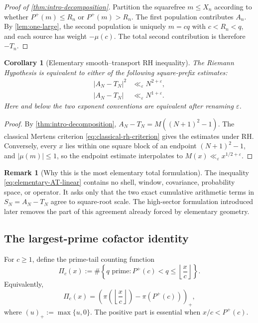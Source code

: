 \documentclass[11pt]{article}
\newtheorem{corollary}[theorem]{Corollary}
\theoremstyle{definition}
\newtheorem{remark}[theorem]{Remark}
\newcommand{\eps}{\varepsilon}
\newcommand{\Pplus}{P^{+}}
\newcommand{\1}{\mathbf{1}}
\begin{document}
\begin{proof}[Proof of \cref{thm:intro-decomposition}]
Partition the squarefree $m\le X_n$ according to whether $\Pplus(m)\le R_n$ or $\Pplus(m)>R_n$.  The first population contributes $A_n$.  By \cref{lem:one-large}, the second population is uniquely $m=cq$ with $c<R_n<q$, and each source has weight $-\mu(c)$.  The total second contribution is therefore $-T_n$.
\end{proof}

\begin{corollary}[Elementary smooth--transport RH inequality]
\label{cor:elementary-AT-RH}
The Riemann Hypothesis is equivalent to either of the following square-prefix estimates:
\begin{align}
 |A_N-T_N|^2&\ll_\eps N^{2+\eps},
 \label{eq:elementary-AT-squared}\\
 |A_N-T_N|&\ll_\eps N^{1+\eps}.
 \label{eq:elementary-AT-linear}
\end{align}
Here and below the two exponent conventions are equivalent after renaming $\eps$.
\end{corollary}

\begin{proof}
By \cref{thm:intro-decomposition}, $A_N-T_N=M((N+1)^2-1)$.  The classical Mertens criterion \cref{eq:classical-rh-criterion} \cite{titchmarsh,montgomery-vaughan} gives the estimates under RH.  Conversely, every $x$ lies within one square block of an endpoint $(N+1)^2-1$, and $|\mu(m)|\le1$, so the endpoint estimate interpolates to $M(x)\ll_\eps x^{1/2+\eps}$.
\end{proof}

\begin{remark}[Why this is the most elementary total formulation]
The inequality \cref{eq:elementary-AT-linear} contains no shell, window, covariance, probability space, or operator.  It asks only that the two exact cumulative arithmetic terms in $S_N=A_N-T_N$ agree to square-root scale.  The high-sector formulation introduced later removes the part of this agreement already forced by elementary geometry.
\end{remark}

\subsection{The largest-prime cofactor identity}
\label{subsec:central-identity}

For $c\ge1$, define the prime-tail counting function
\begin{equation}
 \Pi_c(x)
 :=
 \#\left\{
 q\text{ prime}:
 \Pplus(c)<q\le\left\lfloor\frac{x}{c}\right\rfloor
 \right\}.
 \label{eq:Pi-c}
\end{equation}
Equivalently,
\begin{equation}
 \Pi_c(x)
 =
 \left(
 \pi\!\left(\left\lfloor\frac{x}{c}\right\rfloor\right)
 -\pi(\Pplus(c))
 \right)_{+},
 \label{eq:Pi-c-positive-part}
\end{equation}
where $(u)_+:=\max\{u,0\}$.  The positive part is essential when
$x/c<\Pplus(c)$.
\end{document}
